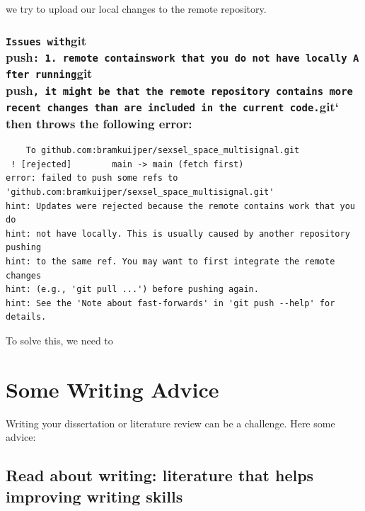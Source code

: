 \documentclass[
]{book}
\begin{document}
we try to upload our local changes to the remote repository.

\hypertarget{issues-withgit-push-1.-remote-containswork-that-you-do-not-have-locally-after-runninggit-push-it-might-be-that-the-remote-repository-contains-more-recent-changes-than-are-included-in-the-current-code.git-then-throws-the-following-error}{%
\subsection{\texorpdfstring{\texttt{Issues\ with}git push\texttt{:\ 1.\ remote\ containswork\ that\ you\ do\ not\ have\ locally\ After\ running}git push\texttt{,\ it\ might\ be\ that\ the\ remote\ repository\ contains\ more\ recent\ changes\ than\ are\ included\ in\ the\ current\ code.}git` then throws the following error:}{Issues withgit push: 1. remote containswork that you do not have locally After runninggit push, it might be that the remote repository contains more recent changes than are included in the current code.git` then throws the following error:}}\label{issues-withgit-push-1.-remote-containswork-that-you-do-not-have-locally-after-runninggit-push-it-might-be-that-the-remote-repository-contains-more-recent-changes-than-are-included-in-the-current-code.git-then-throws-the-following-error}}

\begin{verbatim}
    To github.com:bramkuijper/sexsel_space_multisignal.git
 ! [rejected]        main -> main (fetch first)
error: failed to push some refs to 'github.com:bramkuijper/sexsel_space_multisignal.git'
hint: Updates were rejected because the remote contains work that you do
hint: not have locally. This is usually caused by another repository pushing
hint: to the same ref. You may want to first integrate the remote changes
hint: (e.g., 'git pull ...') before pushing again.
hint: See the 'Note about fast-forwards' in 'git push --help' for details.
\end{verbatim}

To solve this, we need to

\hypertarget{some-writing-advice}{%
\chapter{Some Writing Advice}\label{some-writing-advice}}

Writing your dissertation or literature review can be a challenge. Here some advice:

\hypertarget{read-about-writing-literature-that-helps-improving-writing-skills}{%
\section{Read about writing: literature that helps improving writing skills}\label{read-about-writing-literature-that-helps-improving-writing-skills}}
\end{document}
